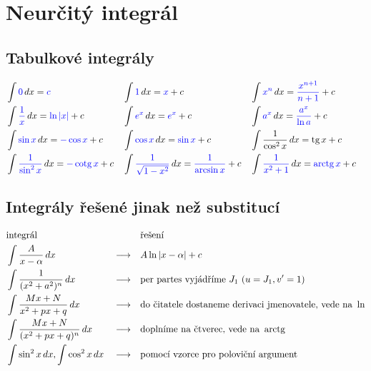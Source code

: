\section{Neurčitý integrál}\label{appint}
\subsection*{Tabulkové integrály}
\begin{align*}
&\int \textcolor{blue}{0} \, dx = \textcolor{blue}{c} & & \int \textcolor{blue}{1}\,  dx = \textcolor{blue}{x}+c & & \int \textcolor{blue}{x^n} \, dx = \textcolor{blue}{\frac{x^{n+1}}{n+1}}+c \\
&\int \textcolor{blue}{\frac{1}{x}} \, dx = \textcolor{blue}{\operatorname{ln} |x|} + c & & \int \textcolor{blue}{e^x}\, dx = \textcolor{blue}{e^x}+c & &  \int \textcolor{blue}{a^x} \, dx = \textcolor{blue}{\frac{a^x}{\operatorname{ln} a}} + c \\
&\int \textcolor{blue}{\sin x} \, dx = \textcolor{blue}{-\cos x} + c & & \int \textcolor{blue}{\cos x} \, dx = \textcolor{blue}{\sin x} +c & &\int \frac{1}{\cos^2 x}\, dx = \operatorname{tg} x + c \\
&\int \textcolor{blue}{\frac{1}{\sin^2 x}} \, dx = \textcolor{blue}{-\operatorname{cotg} x}+c & & \int \textcolor{blue}{\frac{1}{\sqrt{1-x^2} }}\, dx = \textcolor{blue}{\frac{1}{\arcsin x}} + c & &\int \textcolor{blue}{\frac{1}{x^2+1}}\, dx = \textcolor{blue}{\operatorname{arctg} x} + c&
\end{align*}

\subsection*{Integrály řešené jinak než substitucí}
\begin{align*}
    &\textrm{integrál}                        & &                 & & \textrm{řešení} \\
    &\int \frac{A}{x-\alpha}\, dx             & & \longrightarrow & & A\operatorname{ln}|x-\alpha|+c \\
    &\int \frac{1}{(x^2+a^2)^n}\, dx          & & \longrightarrow & & \textrm{per partes vyjádříme } J_1 \textrm{ ($u=J_1, v^\prime=1$)}\\
    &\int \frac{Mx+N}{x^2+px+q}\, dx          & & \longrightarrow & & \textrm{do čitatele dostaneme derivaci jmenovatele, vede na }\operatorname{ln} \\
    &\int \frac{Mx+N}{(x^2+px+q)^n}\, dx      & & \longrightarrow & & \textrm{doplníme na čtverec, vede na }\operatorname{arctg}  \\
    &\int \sin^2 x\, dx, \int \cos^2 x \, dx  & & \longrightarrow & & \textrm{pomocí vzorce pro poloviční argument}
\end{align*}

